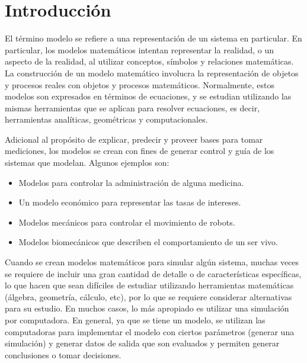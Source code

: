 
\section{Introducción} %
\label{Introduccion} %


El término modelo se refiere a una representación de un sistema en particular. En particular, los modelos matemáticos intentan representar la realidad, o un aspecto de la realidad, al utilizar conceptos, símbolos y relaciones matemáticas. La construcción de un modelo matemático involucra la representación de objetos y procesos reales con objetos y procesos matemáticos. Normalmente, estos modelos son expresados en términos de ecuaciones, y se estudian utilizando las mismas herramientas que se aplican para resolver ecuaciones, es decir, herramientas analíticas, geométricas y computacionales.

Adicional al propósito de explicar, predecir y proveer bases para tomar mediciones, los modelos se crean con fines de generar control y guía de los sistemas que modelan. Algunos ejemplos son:

\begin{itemize}
	\item Modelos para controlar la administración de alguna medicina.
	\item Un modelo económico para representar las tasas de intereses.
	\item Modelos mecánicos para controlar el movimiento de robots.
	\item Modelos biomecánicos que describen el comportamiento de un ser vivo.
\end{itemize}

Cuando se crean modelos matemáticos para simular algún sistema, muchas veces se requiere de incluir una gran cantidad de detalle o de características específicas, lo que hacen que sean difíciles de estudiar utilizando herramientas matemáticas (álgebra, geometría, cálculo, etc), por lo que se requiere considerar alternativas para su estudio. En muchos casos, lo más apropiado es utilizar una simulación por computadora. En general, ya que se tiene un modelo, se utilizan las computadoras para implementar el modelo con ciertos parámetros (generar una simulación) y generar datos de salida que son evaluados y permiten generar conclusiones o tomar decisiones.


